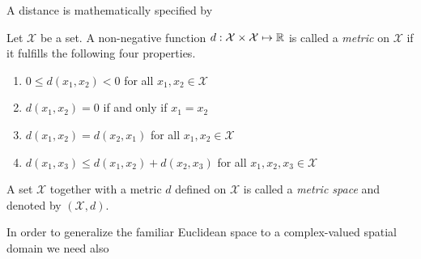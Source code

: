 A distance is mathematically specified by
\begin{definition}\label{def:metric}
	Let $\mathcal{X}$ be a set. A non-negative function
	$d: \mathcal{X} \times \mathcal{X} \mapsto \mathbb{R}$ is called a \emph{metric}
	on $\mathcal{X}$ if it fulfills the following four properties.
	\begin{enumerate}[label=(\alph*)]
		\item $0 \le d\left(x_1, x_2\right) < 0$ for all
		$x_1, x_2 \in \mathcal{X}$
		\item $d\left(x_1, x_2\right) = 0$ if and only if $x_1 = x_2$
		\item $d\left(x_1, x_2\right) = d\left(x_2, x_1\right)$ for all
		$x_1, x_2 \in \mathcal{X}$
		\item $d\left(x_1, x_3\right) \le d\left(x_1, x_2\right) + d\left(x_2, x_3\right)$
		for all $x_1, x_2, x_3 \in \mathcal{X}$
	\end{enumerate}
	A set $\mathcal{X}$ together with a metric $d$ defined on $\mathcal{X}$ is
	called a \emph{metric space} and denoted by $\left(\mathcal{X}, d\right)$.
\end{definition}
In order to generalize the familiar Euclidean space to a complex-valued spatial
domain we need also

